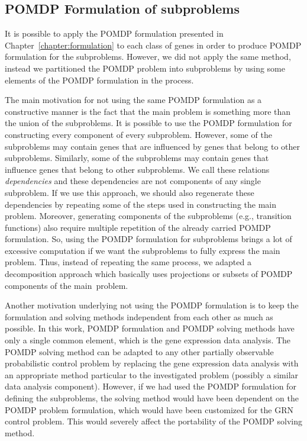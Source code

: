 \subsection{POMDP Formulation of subproblems}

It is possible to apply the POMDP formulation presented in Chapter~\ref{chapter:formulation} to each
class of genes in order to produce POMDP formulation for the subproblems. However, we did not apply the same
method, instead we partitioned the POMDP problem into subproblems by using some elements of the POMDP
formulation in the process.

The main motivation for not using the same POMDP formulation as a constructive manner is the fact that the
main problem is something more than the union of the subproblems. It is possible to use the POMDP formulation
for constructing every component of every subproblem. However, some of the subproblems may contain genes that are influenced by genes that belong to other subproblems. Similarly, some of the subproblems may contain genes that influence genes that belong to other subproblems. We call these relations \emph{dependencies} and these dependencies are not components of any single subproblem. If we use this approach, we
should also regenerate these dependencies by repeating some of the steps used in constructing the main
problem. Moreover, generating components of the subproblems (e.g., transition functions) also require
multiple repetition of the already carried POMDP formulation. So, using the POMDP formulation for subproblems
brings a lot of excessive computation if we want the subproblems to fully express the main problem. Thus,
instead of repeating the same process, we adapted a decomposition approach which basically uses projections
or subsets of POMDP components of the main~problem.

Another motivation underlying not using the POMDP formulation is to keep the formulation and solving methods
independent from each other as much as possible. In this work, POMDP formulation and POMDP solving methods
have only a single common element, which is the gene expression data analysis. The POMDP solving method can
be adapted to any other partially observable probabilistic control problem by replacing the gene expression
data analysis with an appropriate method particular to the investigated problem (possibly a similar data
analysis component). However, if we had used the POMDP formulation for defining the subproblems, the solving
method would have been dependent on the POMDP problem formulation, which would have been customized for the
GRN control problem. This would severely affect the portability of the POMDP solving method.

